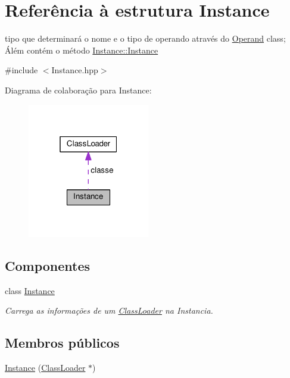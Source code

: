 \hypertarget{struct_instance}{}\section{Referência à estrutura Instance}
\label{struct_instance}


tipo que determinará o nome e o tipo de operando através do \hyperlink{struct_operand}{Operand} class; Álém contém o método \hyperlink{class_instance_1_1_instance}{Instance\+::\+Instance}  




{\ttfamily \#include $<$Instance.\+hpp$>$}



Diagrama de colaboração para Instance\+:
\nopagebreak
\begin{figure}[H]
\begin{center}
\leavevmode
\includegraphics[width=151pt]{struct_instance__coll__graph}
\end{center}
\end{figure}
\subsection*{Componentes}
\begin{DoxyCompactItemize}
\item 
class \hyperlink{class_instance_1_1_instance}{Instance}
\begin{DoxyCompactList}\small\item\em Carrega as informações de um \hyperlink{class_class_loader}{Class\+Loader} na Instancia. \end{DoxyCompactList}\end{DoxyCompactItemize}
\subsection*{Membros públicos}
\begin{DoxyCompactItemize}
\item 
\hyperlink{struct_instance_aca86b4cbc971ace708021f8ef2c6ce43}{Instance} (\hyperlink{class_class_loader}{Class\+Loader} $\ast$)
\end{DoxyCompactItemize}
